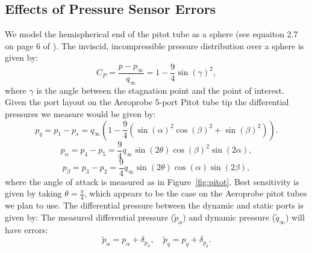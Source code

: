 \documentclass{article}
\begin{document}
\subsection{Effects of Pressure Sensor Errors}
We model the hemispherical end of the pitot tube as a sphere (see
equaiton 2.7 on page 6 of \cite{mhp}).  The inviscid, incompressible
pressure distribution over a sphere is given by:
\begin{equation}
C_P = \frac{p - p_\infty}{q_\infty} = 1 - \frac{9}4 \sin(\gamma)^2,
\end{equation}
where $\gamma$ is the angle between the stagnation point and the point
of interest.  Given the port layout on the Aeroprobe 5-port Pitot tube
tip the differential pressures we measure would be given by:
\begin{equation}
p_q = p_1 - p_s = q_\infty \left(1 - \frac{9}4 \left(\sin(\alpha)^2\cos(\beta)^2
+ \sin(\beta)^2\right)\right).
\end{equation}
\begin{equation}
p_\alpha = p_4 - p_5 = \frac{9}4 q_\infty \sin(2\theta)\cos(\beta)^2\sin(2\alpha),
\end{equation}
\begin{equation}
p_\beta = p_3 - p_2 = \frac{9}4 q_\infty \sin(2\theta)\cos(\alpha)\sin(2\beta),
\end{equation}
where the angle of attack is measured as in Figure~\ref{fig:pitot}.
Best sensitivity is given by taking $\theta = \frac{\pi}{4}$, which appears to be
the case on the Aeroprobe pitot tubes we plan to use.
The differential pressure between the dynamic and static ports is given by:
The measured differential pressure ($\tilde p_\alpha$) and dynamic
pressure ($\tilde q_\infty$) will have errors:
\[
\tilde p_\alpha = p_\alpha + \delta_{p_{\alpha}}, \quad \tilde
p_q = p_q + \delta_{p_q}.
\]



\end{document}
